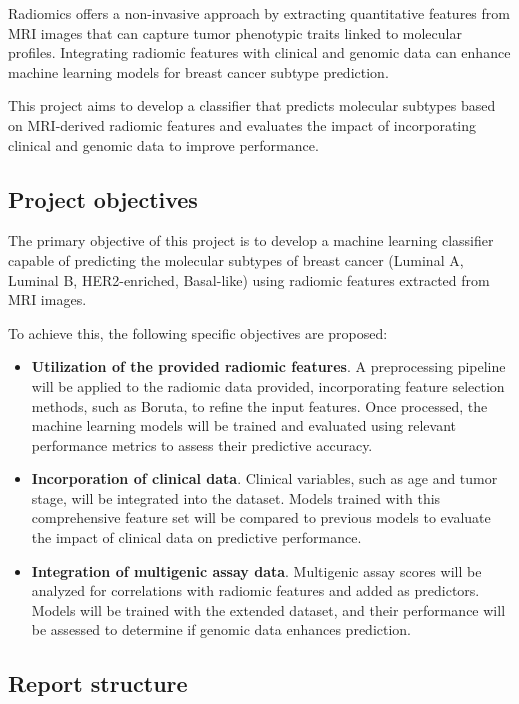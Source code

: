 \documentclass[conference]{IEEEtran}
\begin{document}
Radiomics offers a non-invasive approach by extracting quantitative features from MRI images that can capture tumor phenotypic traits linked to molecular profiles. Integrating radiomic features with clinical and genomic data can enhance machine learning models for breast cancer subtype prediction. \cite{b2}

This project aims to develop a classifier that predicts molecular subtypes based on MRI-derived radiomic features and evaluates the impact of incorporating clinical and genomic data to improve performance.

\subsection{Project objectives}

The primary objective of this project is to develop a machine learning classifier capable of predicting the molecular subtypes of breast cancer (Luminal A, Luminal B, HER2-enriched, Basal-like) using radiomic features extracted from MRI images.

To achieve this, the following specific objectives are proposed:

\begin{itemize}
	\item \textbf{Utilization of the provided radiomic features}. A preprocessing pipeline will be applied to the radiomic data provided, incorporating feature selection methods, such as Boruta, to refine the input features. Once processed, the machine learning models will be trained and evaluated using relevant performance metrics to assess their predictive accuracy.

	\item \textbf{Incorporation of clinical data}. Clinical variables, such as age and tumor stage, will be integrated into the dataset. Models trained with this comprehensive feature set will be compared to previous models to evaluate the impact of clinical data on predictive performance.	

	\item \textbf{Integration of multigenic assay data}. Multigenic assay scores will be analyzed for correlations with radiomic features and added as predictors. Models will be trained with the extended dataset, and their performance will be assessed to determine if genomic data enhances prediction.
\end{itemize}

\subsection{Report structure}
\end{document}
